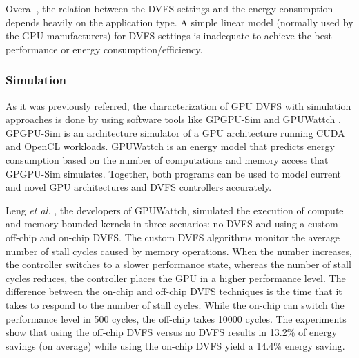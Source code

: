 Overall, the relation between the DVFS settings and the energy consumption depends heavily on the application type. A simple linear model (normally used by the GPU manufacturers) for DVFS settings is inadequate to achieve the best performance or energy consumption/efficiency.

\subsubsection{Simulation}

As it was previously referred, the characterization of GPU DVFS with simulation approaches is done by using software tools like GPGPU-Sim \cite{noauthor_gpgpu-sim/gpgpu-sim_distribution_2019} and GPUWattch \cite{noauthor_gpu_2011} \cite{leng_gpuwattch:_2013}. GPGPU-Sim is an architecture simulator of a GPU architecture running CUDA and OpenCL workloads. GPUWattch is an energy model that predicts energy consumption based on the number of computations and memory access that GPGPU-Sim simulates. Together, both programs can be used to model current and novel GPU architectures and DVFS controllers accurately.

Leng \textit{et al.} \cite{leng_gpuwattch:_2013}, the developers of GPUWattch, simulated the execution of compute and memory-bounded kernels in three scenarios: no DVFS and using a custom off-chip and on-chip DVFS. The custom DVFS algorithms monitor the average number of stall cycles caused by memory operations. When the number increases, the controller switches to a slower performance state, whereas the number of stall cycles reduces, the controller places the GPU in a higher performance level. The difference between the on-chip and off-chip DVFS techniques is the time that it takes to respond to the number of stall cycles. While the on-chip can switch the performance level in 500 cycles, the off-chip takes 10000 cycles. The experiments show that using the off-chip DVFS versus no DVFS results in 13.2\% of energy savings (on average) while using the on-chip DVFS yield a 14.4\% energy saving.

